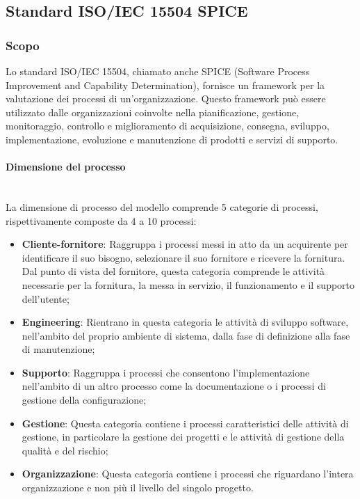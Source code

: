 \subsection{Standard ISO/IEC 15504 SPICE}
\subsubsection{Scopo}
Lo standard ISO/IEC 15504, chiamato anche SPICE (Software Process Improvement and Capability Determination), fornisce un framework per la valutazione dei processi di un'organizzazione. Questo framework può essere utilizzato dalle organizzazioni coinvolte nella pianificazione, gestione, monitoraggio, controllo e miglioramento di acquisizione, consegna, sviluppo, implementazione, evoluzione e manutenzione di prodotti e servizi di supporto.
\paragraph {Dimensione del processo}\mbox{}\\
La dimensione di processo del modello comprende 5 categorie di processi, rispettivamente composte da 4 a 10 processi:
\begin{itemize}
	\item \textbf{Cliente-fornitore}: Raggruppa i processi messi in atto da un acquirente per identificare il suo bisogno, selezionare il suo fornitore e ricevere la fornitura. Dal punto di vista del fornitore, questa categoria comprende le attività necessarie per la fornitura, la messa in servizio, il funzionamento e il supporto dell'utente;
	\item \textbf{Engineering}: Rientrano in questa categoria le attività di sviluppo software, nell'ambito del proprio ambiente di sistema, dalla fase di definizione alla fase di manutenzione;
	\item \textbf{Supporto}: Raggruppa i processi che consentono l'implementazione nell'ambito di un altro processo come la documentazione o i processi di gestione della configurazione;
	\item \textbf{Gestione}: Questa categoria contiene i processi caratteristici delle attività di gestione, in particolare la gestione dei progetti e le attività di gestione della qualità e  del rischio;
	\item \textbf{Organizzazione}: Questa categoria contiene i processi che riguardano l'intera organizzazione e non più il livello del singolo progetto.
\end{itemize}
